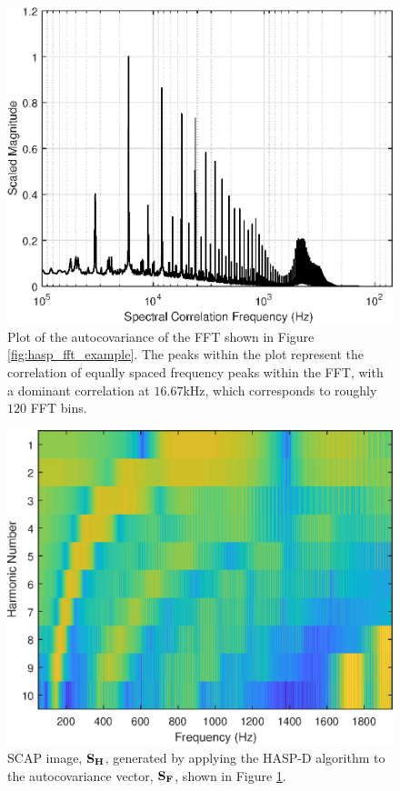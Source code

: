 \begin{figure}[tp]
	\includegraphics[width=\textwidth]{./dasp_algorithm_results/scap_filenum_12001.eps}
	\centering
	\caption{Plot of the autocovariance of the FFT shown in Figure \ref{fig:hasp_fft_example}.  The peaks within the plot represent the correlation of equally spaced frequency peaks within the FFT, with a dominant correlation at $16.67$kHz, which corresponds to roughly $120$ FFT bins.}
	\label{fig:scap_xcov_example}
\end{figure}

\begin{figure}[tp]
	\includegraphics[width=\textwidth]{./dasp_algorithm_results/scap_hasp_filenum_12001.eps}
	\centering
	\caption{SCAP image, $\bf{S}_H$, generated by applying the HASP-D algorithm to the autocovariance vector, $\bf{S}_F$, shown in Figure \ref{fig:scap_xcov_example}.}
	\label{fig:scap_hasp_example}
\end{figure}

